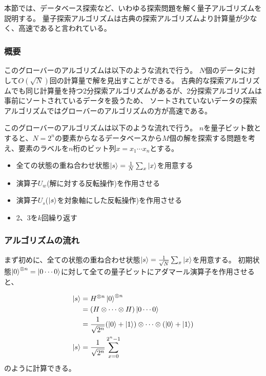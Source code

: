 \begin{comment}
    ここではグローバーのアルゴリズムについて記述する
\end{comment}

本節では、データベース探索など、いわゆる探索問題を解く量子アルゴリズムを説明する。
量子探索アルゴリズムは古典の探索アルゴリズムより計算量が少なく、高速であると言われている。

\subsubsection{概要}
このグローバーのアルゴリズムは以下のような流れで行う。
$N$個のデータに対して$O(\sqrt{N})$回の計算量で解を見出すことができる。
古典的な探索アルゴリズムでも同じ計算量を持つ2分探索アルゴリズムがあるが、2分探索アルゴリズムは事前にソートされているデータを扱うため、
ソートされていないデータの探索アルゴリズムではグローバーのアルゴリズムの方が高速である。

このグローバーのアルゴリズムは以下のような流れで行う。
$n$を量子ビット数とすると、$N = 2^n$の要素からなるデータベースから$M$個の解を探索する問題を考え、要素のラベルを$n$桁のビット列$x = x_1 \cdots x_n$とする。

\begin{itemize}
    \item 全ての状態の重ね合わせ状態$\ket{s} = \frac{1}{N} \sum_{x} \ket{x}$を用意する
    \item 演算子$U_w$(解に対する反転操作)を作用させる
    \item 演算子$U_s$($\ket{s}$を対象軸にした反転操作)を作用させる
    \item 2、3を$k$回繰り返す
\end{itemize}

\subsubsection{アルゴリズムの流れ}
まず初めに、全ての状態の重ね合わせ状態$\ket{s} = \frac{1}{\sqrt{N}} \sum_{x} \ket{x}$を用意する。
初期状態$\ket{0}^{\otimes n} = \ket{0 \cdots 0}$に対して全ての量子ビットにアダマール演算子を作用させると、

\begin{equation}
    \begin{split}
      \ket{s} &= H^{\otimes n}\ket{0}^{\otimes n} \\
      &= (H \otimes \cdots \otimes H)\ket{0 \cdots 0} \\
      &= \frac{1}{\sqrt{2^n}}(\ket{0} + \ket{1}) \otimes \cdots \otimes (\ket{0} + \ket{1}) \\
      \ket{s} &= \frac{1}{\sqrt{2^n}} \sum_{x = 0}^{2^n - 1}
    \end{split}
\end{equation}
のように計算できる。

